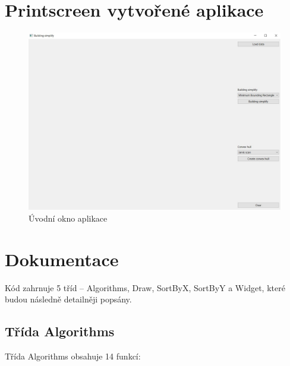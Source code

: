 \documentclass[11pt]{article}
\begin{document}
	\section{Printscreen vytvořené aplikace}
	\begin{figure}[htbh]
		\centering
		\includegraphics[scale=0.4]{images/U2_aplikace_uvodni_okno.jpg} 
		\caption{Úvodní okno aplikace}
		\label{fig:uvodni_okno}
	\end{figure} 
		
	
	\section{Dokumentace}
	Kód zahrnuje 5 tříd – Algorithms, Draw, SortByX, SortByY a Widget, které budou následně detailněji popsány.      
	
	\subsection{Třída Algorithms}
	Třída Algorithms obsahuje 14 funkcí:  
	
\end{document}
